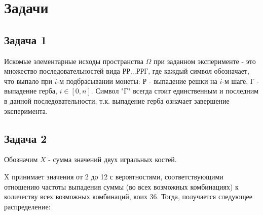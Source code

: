 \documentclass[a4paper,11pt]{article}
\begin{document}
\section{Задачи}

\subsection{Задача 1}

Искомые элементарные исходы пространства $\Omega$ при заданном эксперименте - это множество последовательностей вида РР...РРГ, где каждый символ обозначает, что выпало при $i$-м подбрасывании монеты: Р - выпадение решки на $i$-м шаге, Г - выпадение герба, $i \in [0,n]$. Символ "Г" всегда стоит единственным и последним в данной последовательности, т.к. выпадение герба означает завершение эксперимента.

\subsection{Задача 2}

Обозначим $X$ - сумма значений двух игральных костей.

X принимает значения от 2 до 12 с вероятностями, соответствующими отношению частоты выпадения суммы (во всех возможных комбинациях) к количеству всех возможных комбинаций, коих 36. Тогда, получается следующее распределение:

\medskip
\end{document}
